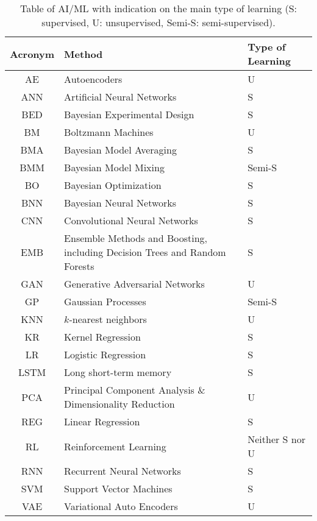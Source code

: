 \documentclass[aps,rmp,reprint,amsmath,amssymb,graphicx,longbibliography]{revtex4-1}
\begin{document}
\begin{table*}[!htb]
 \caption{Table of AI/ML with indication on the main type of learning (S: supervised,  U: unsupervised,  Semi-S: semi-supervised).
 }
    \label{tab:acronyms}
\begin{ruledtabular}
    \begin{tabular}{cll}
    Acronym & Method & Type of Learning \\ \hline
    AE & Autoencoders & U \\
    ANN     & Artificial Neural Networks & S  \\
  BED & Bayesian Experimental Design   & S \\
        BM & Boltzmann Machines & U \\
    BMA & Bayesian Model Averaging & S \\
    BMM & Bayesian Model Mixing & Semi-S \\
    BO & Bayesian Optimization & S \\
    BNN & Bayesian Neural Networks & S \\
    CNN & Convolutional Neural Networks & S \\
     EMB  & Ensemble Methods  and Boosting, including Decision Trees and Random Forests & S \\
    GAN & Generative Adversarial Networks  & U \\
    GP & Gaussian Processes  & Semi-S \\
    KNN & $k$-nearest neighbors & U \\
    KR & Kernel Regression & S \\
    LR & Logistic Regression & S\\
    LSTM & Long short-term memory & S\\
    PCA & Principal Component Analysis \& Dimensionality Reduction & U \\
    REG    & Linear Regression  & S \\
    RL & Reinforcement Learning & Neither S nor U \\
    RNN & Recurrent Neural Networks & S \\
    SVM & Support Vector Machines & S \\
    VAE & Variational Auto Encoders & U
     \end{tabular}
 \end{ruledtabular}
\end{table*}
\end{document}
